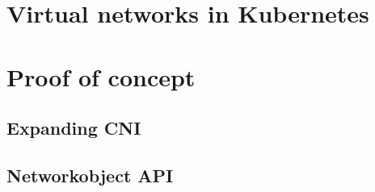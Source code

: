 \section{Virtual networks in Kubernetes}
\label{sec:k8s-virtual-networks}

\section{Proof of concept}
\label{sec:proof-of-concept}

\subsection{Expanding CNI}
\label{subsec:expanding-cni}

\subsection{Networkobject API}
\label{subsec:networkobject-api}


